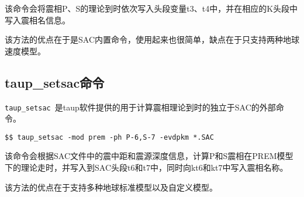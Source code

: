 该命令会将震相P、S的理论到时依次写入头段变量t3、t4中，并在相应的K头段中写入震相名信息。

该方法的优点在于是SAC内置命令，使用起来也很简单，缺点在于只支持两种地球速度模型。

\subsection{taup\_setsac命令}
\lstinline{taup_setsac}~是taup软件提供的用于计算震相理论到时的独立于SAC的外部命令。

\begin{lstlisting}[style=Shell]
$$ taup_setsac -mod prem -ph P-6,S-7 -evdpkm *.SAC
\end{lstlisting}

该命令会根据SAC文件中的震中距和震源深度信息，计算P和S震相在PREM模型下的理论走时，并写入到SAC头段t6和t7中，同时向kt6和kt7中写入震相名称。

该方法的优点在于支持多种地球标准模型以及自定义模型。

